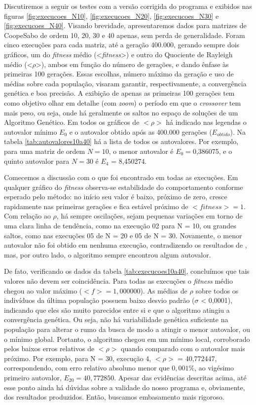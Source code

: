 	Discutiremos a seguir os testes com a versão corrigida do programa e exibidos nas figuras \ref{fig:execucoes_N10}, \ref{fig:execucoes_N20}, \ref{fig:execucoes_N30} e \ref{fig:execucoes_N40}. Visando brevidade, apresentaremos dados para matrizes de Coope\-Sabo de ordem 10, 20, 30 e 40 apenas, sem perda de generalidade. Foram cinco execuções para cada matriz, até a geração 400.000, gerando sempre dois gráficos, um do \textit{fitness} médio (<\textit{fitness}>) e outro do Quociente de Rayleigh médio (<$\rho$>), ambos em função do número de gerações, e dando ênfase às primeiras 100 gerações. Essas escolhas, número máximo da geração e uso de médias sobre cada população, visaram garantir, respectivamente, a convergência genética e boa precisão. A exibição de apenas as primeiras 100 gerações tem como objetivo olhar em detalhe (com \textit{zoom}) o período em que o \textit{crossover} tem mais peso, ou seja, onde há geralmente os saltos no espaço de soluções de um Algoritmo Genético. Em todos os gráficos de $<\rho>$ há indicado nas legendas o autovalor mínimo $E_0$ e o autovalor obtido após as 400.000 gerações ($E_{obtido}$). Na tabela \ref{tab:autovalores10a40} há a lista de todos os autovalores. Por exemplo, para uma matriz de ordem $N = 10$, o menor autovalor é $E_0 = $0,386075, e o quinto autovalor para $N = 30$ é $E_4$ = 8,450274.
	
	Comecemos a discussão com o que foi encontrado em todas as execuções. Em qualquer gráfico do \textit{fitness} observa-se estabilidade do comportamento conforme esperado pelo método: no início seu valor é baixo, próximo de zero, cresce rapidamente nas primeiras gerações e fica estável próximo de $<fitness> = 1$. Com relação ao $\rho$, há sempre oscilações, sejam pequenas variações em torno de uma clara linha de tendência, como na execução 02 para N = 10, ou grandes saltos, como nas execuções 05 de N = 20 e 05 de N = 30. Novamente, o menor autovalor não foi obtido em nenhuma execução, contradizendo os resultados de \cite{metodo2004}, mas, por outro lado, o algoritmo sempre encontrou algum autovalor.
	
	De fato, verificando os dados da tabela \ref{tab:execucoes10a40}, concluímos que tais valores não devem ser coincidência. Para todas as execuções o \textit{fitness} médio chegou ao valor máximo ($<f> = 1,000000$). As médias de $\rho$ sobre todos os indivíduos da última população possuem baixo desvio padrão ($\sigma$ < 0,0001), indicando que eles são muito parecidos entre si e que o algoritmo atingiu a convergência genética. Ou seja, não há variabilidade genética suficiente na população para alterar o rumo da busca de modo a atingir o menor autovalor, ou o mínimo global. Portanto, o algoritmo chegou em um mínimo local, corroborado pelos baixos erros relativos de $<\rho>$ quando comparado com o autovalor mais próximo. Por exemplo, para N = 30, execução 4,  $<\rho>$ = 40,772447, correspondendo, com erro relativo absoluno menor que $0,001\%$, ao vigésimo primeiro autovalor, $E_{20} = 40,772850$. Apesar das evidências descritas acima, até esse ponto ainda há dúvidas sobre a validade do nosso programa e, obviamente, dos resultados produzidos. Então, buscamos embasamento mais rigoroso.

